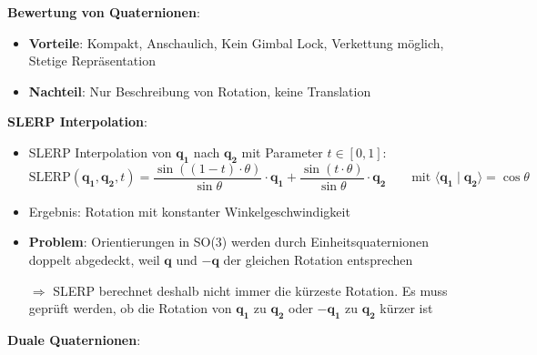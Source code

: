 \textbf{Bewertung von Quaternionen}:
\begin{itemize}
	\item \textbf{Vorteile}: Kompakt, Anschaulich, Kein Gimbal Lock, Verkettung möglich, Stetige Repräsentation
	\item \textbf{Nachteil}: Nur Beschreibung von Rotation, keine Translation
\end{itemize}
\bigskip
\textbf{SLERP Interpolation}:
\begin{itemize}
	\item SLERP Interpolation von $\mathbf{q_1}$ nach $\mathbf{q_2}$ mit Parameter $t\in[0,1]$:	
	$$\text{SLERP}(\mathbf{q_1},\mathbf{q_2},t)=\frac{\sin((1-t)\cdot\theta)}{\sin\theta}\cdot\mathbf{q_1}+\frac{\sin(t\cdot\theta)}{\sin\theta}\cdot\mathbf{q_2}\qquad \text{mit }\langle\mathbf{q_1}\mid\mathbf{q_2}\rangle=\cos\theta$$
	\item Ergebnis: Rotation mit konstanter Winkelgeschwindigkeit
	\item \textbf{Problem}: Orientierungen in SO(3) werden durch Einheitsquaternionen doppelt abgedeckt, weil $\mathbf{q}$ und $-\mathbf{q}$ der gleichen Rotation entsprechen
	
	$\Rightarrow$ SLERP berechnet deshalb nicht immer die kürzeste Rotation. Es muss geprüft werden, ob die Rotation von $\mathbf{q_1}$ zu $\mathbf{q_2}$ oder $-\mathbf{q_1}$ zu $\mathbf{q_2}$ kürzer ist
\end{itemize}
\pagebreak
\textbf{Duale Quaternionen}:
